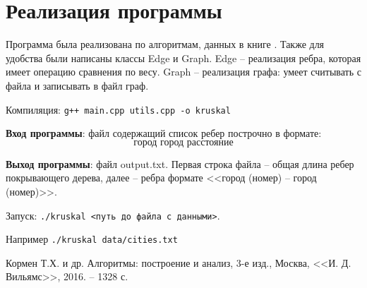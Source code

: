 \documentclass[12pt, a4paper]{article}
\begin{document}
    \section{Реализация программы}
        Программа была реализована по алгоритмам, данных в книге \cite[разделы 21.3, 23.2]{clrs}. Также для удобства были написаны классы Edge и Graph. Edge -- реализация ребра, которая имеет операцию сравнения по весу. Graph -- реализация графа: умеет считывать с файла и записывать в файл граф.

        Компиляция: \verb|g++ main.cpp utils.cpp -o kruskal|

        \textbf{Вход программы}: файл содержащий список ребер построчно в формате:
        $$\textbf{город город расстояние}$$

        \textbf{Выход программы}: файл output.txt. Первая строка файла -- общая длина ребер покрывающего дерева, далее -- ребра формате <<город (номер) -- город (номер)>>.

        Запуск: \verb|./kruskal <путь до файла с данными>|.

        \quad Например \verb|./kruskal data/cities.txt|

    \begin{thebibliography}{9}
        Кормен Т.Х. и др. Алгоритмы: построение и анализ, 3-е изд., Москва, <<И. Д. Вильямс>>, 2016. -- 1328 с.
    \end{thebibliography}
\end{document}
